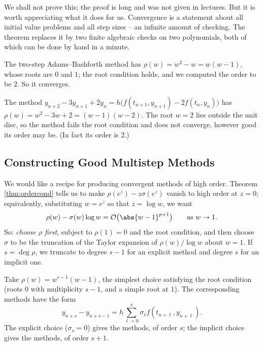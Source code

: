We shall not prove this; the proof is long and was not given in lectures. But it is worth appreciating what it does for us. Convergence is a statement about all initial value problems and all step sizes -- an infinite amount of checking. The theorem replaces it by two finite algebraic checks on two polynomials, both of which can be done by hand in a minute.

\begin{example}
  The two-step Adams--Bashforth method has $\rho(w) = w^2 - w = w(w-1)$, whose roots are $0$ and $1$; the root condition holds, and we computed the order to be $2$. So it converges.
\end{example}

\begin{example}
  The method $y_{n+2} - 3y_{n+1} + 2y_n = h\big(f(t_{n+1},y_{n+1}) - 2f(t_n,y_n)\big)$ has $\rho(w) = w^2 - 3w + 2 = (w-1)(w-2)$. The root $w = 2$ lies outside the unit disc, so the method fails the root condition and does not converge, however good its order may be. (In fact its order is $2$.)
\end{example}

\subsection{Constructing Good Multistep Methods}

We would like a recipe for producing convergent methods of high order. Theorem \ref{thm:ordercond} tells us to make $\rho(e^z) - z\sigma(e^z)$ vanish to high order at $z = 0$; equivalently, substituting $w = e^z$ so that $z = \log w$, we want
$$
\rho(w) - \sigma(w)\log w = \mathcal{O}\big(\abs{w-1}^{p+1}\big) \qquad \text{as } w \to 1.
$$
So: \emph{choose $\rho$ first}, subject to $\rho(1) = 0$ and the root condition, and then choose $\sigma$ to be the truncation of the Taylor expansion of $\rho(w)/\log w$ about $w = 1$. If $s = \deg\rho$, we truncate to degree $s-1$ for an explicit method and degree $s$ for an implicit one.

\begin{method}
  Take $\rho(w) = w^{s-1}(w-1)$, the simplest choice satisfying the root condition (roots $0$ with multiplicity $s-1$, and a simple root at $1$). The corresponding methods have the form
  $$
  y_{n+s} - y_{n+s-1} = h\sum_{\ell = 0}^{s}\sigma_\ell f(t_{n+\ell}, y_{n+\ell}).
  $$
  The explicit choice ($\sigma_s = 0$) gives the  methods, of order $s$; the implicit choice gives the  methods, of order $s+1$.
\end{method}


